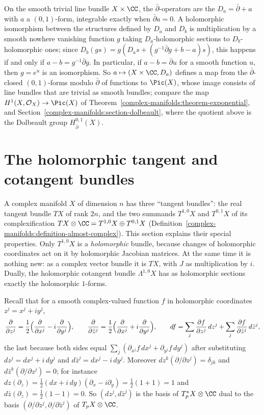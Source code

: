 \begin{example}\label{complex-manifolds:example-dbar-trivial-bundle}
On the smooth trivial line bundle $X \times \CC$, the $\bar\partial$-operators are the $D_a = \bar\partial + a$ with $a$ a $(0,1)$-form, integrable exactly when $\bar\partial a = 0$. A holomorphic isomorphism between the
structures defined by $D_a$ and $D_b$ is multiplication by a smooth nowhere vanishing function $g$ taking $D_a$-holomorphic sections to $D_b$-holomorphic ones; since
$D_b(gs) = g(D_as + (g^{-1}\bar\partial g + b - a)s)$, this happens if and only if $a - b = g^{-1}\bar\partial g$. In particular, if $a - b = \bar\partial u$ for a smooth function $u$, then $g = e^u$ is an
isomorphism. So $a \mapsto (X \times \CC, D_a)$ defines a map from the $\bar\partial$-closed $(0,1)$-forms modulo $\bar\partial$ of functions to $\Pic(X)$, whose image consists of line bundles that are trivial as smooth
bundles; compare the map $H^1(X, \mathcal{O}_X) \to \Pic(X)$ of Theorem~\ref{complex-manifolds:theorem-exponential}, and Section~\ref{complex-manifolds:section-dolbeault}, where the quotient above is the Dolbeault group
$H^{0,1}_{\bar\partial}(X)$.
\end{example}

\section{The holomorphic tangent and cotangent bundles}\label{complex-manifolds:section-tangent}

A complex manifold $X$ of dimension $n$ has three ``tangent bundles'': the real tangent bundle $TX$ of rank $2n$, and the two summands $T^{1,0}X$ and $T^{0,1}X$ of its complexification
$TX \otimes \CC = T^{1,0}X \oplus T^{0,1}X$ (Definition~\ref{complex-manifolds:definition-almost-complex}). This section explains their special properties. Only $T^{1,0}X$ is a \emph{holomorphic} bundle, because changes of holomorphic
coordinates act on it by holomorphic Jacobian matrices. At the same time it is nothing new: as a complex vector bundle it is $TX$, with $J$ as multiplication by $i$. Dually, the holomorphic cotangent bundle
$\Lambda^{1,0}X$ has as holomorphic sections exactly the holomorphic $1$-forms.

Recall that for a smooth complex-valued function $f$ in holomorphic coordinates $z^j = x^j + iy^j$,
\[
\frac{\partial}{\partial z^j} = \frac12\Bigl(\frac{\partial}{\partial x^j} - i\frac{\partial}{\partial y^j}\Bigr), \qquad \frac{\partial}{\partial\bar z^j} = \frac12\Bigl(\frac{\partial}{\partial x^j} + i\frac{\partial}{\partial y^j}\Bigr), \qquad
df = \sum_j\frac{\partial f}{\partial z^j}\,dz^j + \sum_j\frac{\partial f}{\partial\bar z^j}\,d\bar z^j,
\]
the last because both sides equal $\sum_j(\partial_{x^j}f\,dx^j + \partial_{y^j}f\,dy^j)$ after substituting $dz^j = dx^j + i\,dy^j$ and $d\bar z^j = dx^j - i\,dy^j$. Moreover $dz^k(\partial/\partial z^j) = \delta_{jk}$ and
$d\bar z^k(\partial/\partial z^j) = 0$; for instance $dz(\partial_z) = \frac12(dx + i\,dy)(\partial_x - i\partial_y) = \frac12(1 + 1) = 1$ and $d\bar z(\partial_z) = \frac12(1 - 1) = 0$. So $(dz^j, d\bar z^j)$ is the
basis of $T^*_pX \otimes \CC$ dual to the basis $(\partial/\partial z^j, \partial/\partial\bar z^j)$ of $T_pX \otimes \CC$.

